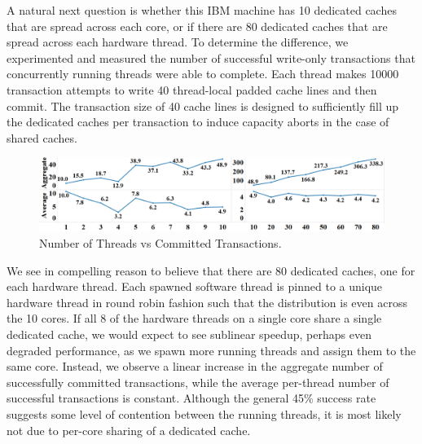 A natural next question is whether this IBM machine 
has 10 dedicated caches that
are spread across each core, or if there are 80 
dedicated caches that are spread
across each hardware thread. To determine the 
difference, we experimented and
measured the number of successful write-only 
transactions that concurrently
running threads were able to complete. Each 
thread makes 10000 transaction
attempts to write 40 thread-local padded cache 
lines and then commit. The
transaction size of 40 cache lines is designed 
to sufficiently fill up the
dedicated caches per transaction to induce capacity 
aborts in the case of shared
caches.

\begin{figure}[H]%
\centering
\includegraphics[width=\linewidth]{images/wttm_core_or_thread_ibm}
\caption{Number of Threads vs Committed Transactions. 
}
\label{fig:wttm_core_or_thread_ibm}
\end{figure}


We see in  compelling 
reason to believe that
there are 80 dedicated caches, one for each hardware 
thread. Each spawned
software thread is pinned to a unique hardware thread 
in round robin fashion
such that the distribution is even across the 10 cores. 
If all 8 of the
hardware threads on a single core share a single 
dedicated cache, we would
expect to see sublinear speedup, perhaps even degraded 
performance, as we spawn
more running threads and assign them to the same core. 
Instead, we observe a
linear increase in the aggregate number of successfully 
committed transactions,
while the average per-thread number of successful 
transactions is constant.
Although the general 45\% success rate suggests some 
level of contention between
the running threads, it is most likely not due to 
per-core sharing of a
dedicated cache.
 
